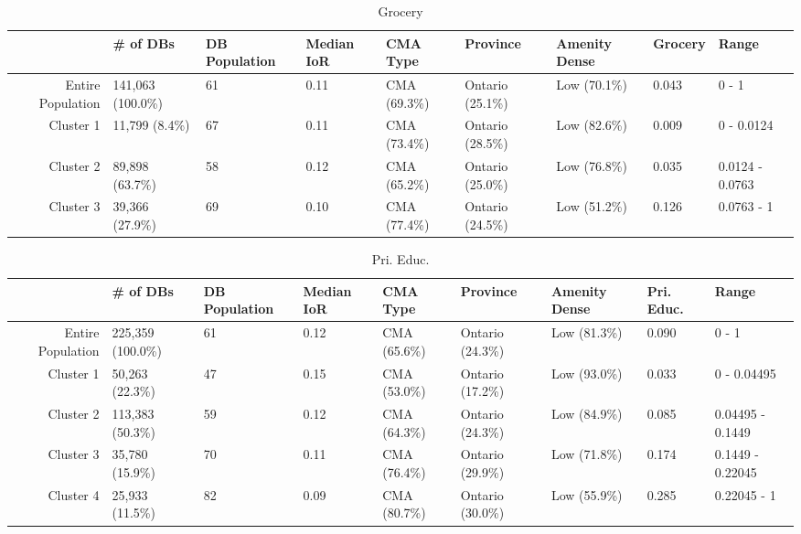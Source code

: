 \documentclass[10pt, a4paper]{article}
\begin{document}
\begin{sidewaystable}[ht]
\centering
\begin{tabular}{rllllllll}
  \hline
 & \# of DBs & DB Population & Median IoR & CMA Type & Province & Amenity Dense & Grocery & Range \\ 
  \hline
Entire Population & 141,063 (100.0\%) & 61 & 0.11 & CMA (69.3\%) & Ontario (25.1\%) & Low (70.1\%) & 0.043 & 0 - 1 \\ 
  Cluster 1 & 11,799 (8.4\%) & 67 & 0.11 & CMA (73.4\%) & Ontario (28.5\%) & Low (82.6\%) & 0.009 & 0 - 0.0124 \\ 
  Cluster 2 & 89,898 (63.7\%) & 58 & 0.12 & CMA (65.2\%) & Ontario (25.0\%) & Low (76.8\%) & 0.035 & 0.0124 - 0.0763 \\ 
  Cluster 3 & 39,366 (27.9\%) & 69 & 0.10 & CMA (77.4\%) & Ontario (24.5\%) & Low (51.2\%) & 0.126 & 0.0763 - 1 \\ 
   \hline
\end{tabular}
\caption{Grocery} 
\end{sidewaystable}





 \pagebreak 
 
\begin{sidewaystable}[ht]
\centering
\begin{tabular}{rllllllll}
  \hline
 & \# of DBs & DB Population & Median IoR & CMA Type & Province & Amenity Dense & Pri. Educ. & Range \\ 
  \hline
Entire Population & 225,359 (100.0\%) & 61 & 0.12 & CMA (65.6\%) & Ontario (24.3\%) & Low (81.3\%) & 0.090 & 0 - 1 \\ 
  Cluster 1 & 50,263 (22.3\%) & 47 & 0.15 & CMA (53.0\%) & Ontario (17.2\%) & Low (93.0\%) & 0.033 & 0 - 0.04495 \\ 
  Cluster 2 & 113,383 (50.3\%) & 59 & 0.12 & CMA (64.3\%) & Ontario (24.3\%) & Low (84.9\%) & 0.085 & 0.04495 - 0.1449 \\ 
  Cluster 3 & 35,780 (15.9\%) & 70 & 0.11 & CMA (76.4\%) & Ontario (29.9\%) & Low (71.8\%) & 0.174 & 0.1449 - 0.22045 \\ 
  Cluster 4 & 25,933 (11.5\%) & 82 & 0.09 & CMA (80.7\%) & Ontario (30.0\%) & Low (55.9\%) & 0.285 & 0.22045 - 1 \\ 
   \hline
\end{tabular}
\caption{Pri. Educ.} 
\end{sidewaystable}
\end{document}
